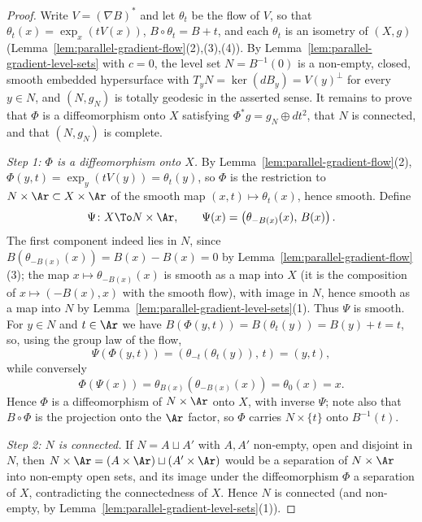 \begin{proof}
Write $V=(\nabla B)^*$ and let $\theta_t$ be the flow of $V$, so that
$\theta_t(x)=\exp_x(tV(x))$, $B\circ\theta_t=B+t$, and each $\theta_t$
is an isometry of $(X,g)$
(Lemma~\ref{lem:parallel-gradient-flow}(2),(3),(4)). By
Lemma~\ref{lem:parallel-gradient-level-sets} with $c=0$, the level set
$N=B^{-1}(0)$ is a non-empty, closed, smooth embedded hypersurface with
$T_yN=\ker(dB_y)=V(y)^\perp$ for every $y\in N$, and $(N,g_N)$ is
totally geodesic in the asserted sense. It remains to prove that $\Phi$
is a diffeomorphism onto $X$ satisfying
$\Phi^*g=g_N\oplus dt^2$, that $N$ is connected, and that $(N,g_N)$ is
complete.

\emph{Step 1: $\Phi$ is a diffeomorphism onto $X$.} By
Lemma~\ref{lem:parallel-gradient-flow}(2),
$\Phi(y,t)=\exp_y(tV(y))=\theta_t(y)$, so $\Phi$ is the restriction to
$N\times\Ar\subset X\times\Ar$ of the smooth map
$(x,t)\mapsto\theta_t(x)$, hence smooth. Define
$$\Psi\colon X\To N\times\Ar,\qquad
\Psi(x)=\left(\theta_{-B(x)}(x),\,B(x)\right).$$
The first component indeed lies in $N$, since
$B\left(\theta_{-B(x)}(x)\right)=B(x)-B(x)=0$ by
Lemma~\ref{lem:parallel-gradient-flow}(3); the map
$x\mapsto\theta_{-B(x)}(x)$ is smooth as a map into $X$ (it is the
composition of $x\mapsto(-B(x),x)$ with the smooth flow), with image in
$N$, hence smooth as a map into $N$ by
Lemma~\ref{lem:parallel-gradient-level-sets}(1). Thus $\Psi$ is smooth.
For $y\in N$ and $t\in\Ar$ we have
$B\left(\Phi(y,t)\right)=B(\theta_t(y))=B(y)+t=t$, so, using the group
law of the flow,
$$\Psi\left(\Phi(y,t)\right)
=\left(\theta_{-t}\left(\theta_t(y)\right),\,t\right)=(y,t),$$
while conversely
$$\Phi\left(\Psi(x)\right)
=\theta_{B(x)}\left(\theta_{-B(x)}(x)\right)=\theta_0(x)=x .$$
Hence $\Phi$ is a diffeomorphism of $N\times\Ar$ onto $X$, with inverse
$\Psi$; note also that $B\circ\Phi$ is the projection onto the $\Ar$
factor, so $\Phi$ carries $N\times\{t\}$ onto $B^{-1}(t)$.

\emph{Step 2: $N$ is connected.} If $N=A\sqcup A'$ with $A,A'$
non-empty, open and disjoint in $N$, then
$N\times\Ar=(A\times\Ar)\sqcup(A'\times\Ar)$ would be a separation of
$N\times\Ar$ into non-empty open sets, and its image under the
diffeomorphism $\Phi$ a separation of $X$, contradicting the
connectedness of $X$. Hence $N$ is connected (and non-empty, by
Lemma~\ref{lem:parallel-gradient-level-sets}(1)).


\end{proof}
